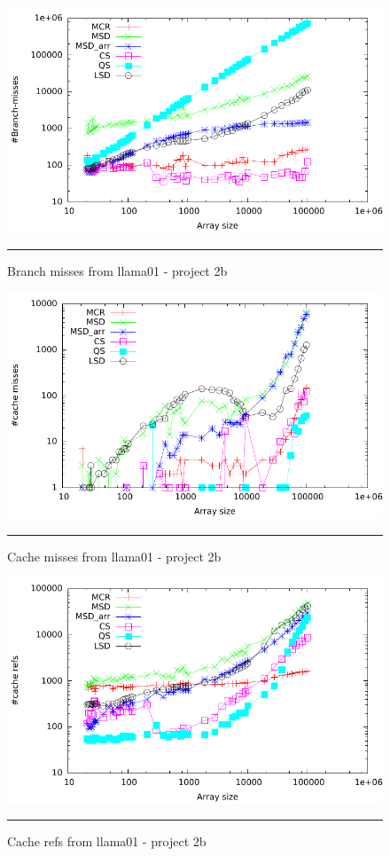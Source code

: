 \begin{figure}[ht]
	\centering
		\includegraphics[width=\textwidth]{./Appendices/Figures/Project2b/Branch_misses.pdf}
		\rule{35em}{0.5pt}
	\caption*{
	Branch misses from llama01 - project 2b
	}
	\label{fig:Branch_misses_p2bputty}
\end{figure}
\begin{figure}[ht]
	\centering
		\includegraphics[width=\textwidth]{./Appendices/Figures/Project2b/Cache_misses.pdf}
		\rule{35em}{0.5pt}
	\caption*{
	Cache misses from llama01 - project 2b
	}
	\label{fig:Cache_misses_p2b_putty}
\end{figure}
\begin{figure}[ht]
	\centering
		\includegraphics[width=\textwidth]{./Appendices/Figures/Project2b/Cache_refs.pdf}
		\rule{35em}{0.5pt}
	\caption*{
	Cache refs from llama01 - project 2b
	}
	\label{fig:Cache_refs_p2b_putty}
\end{figure}

